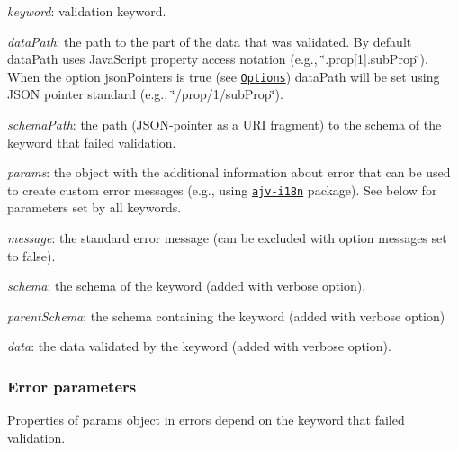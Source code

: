 \begin{DoxyItemize}
\item {\itshape keyword}\+: validation keyword.
\item {\itshape data\+Path}\+: the path to the part of the data that was validated. By default {\ttfamily data\+Path} uses Java\+Script property access notation (e.\+g., {\ttfamily \char`\"{}.\+prop\mbox{[}1\mbox{]}.\+sub\+Prop\char`\"{}}). When the option {\ttfamily json\+Pointers} is true (see \href{#options}{\tt Options}) {\ttfamily data\+Path} will be set using J\+S\+ON pointer standard (e.\+g., {\ttfamily \char`\"{}/prop/1/sub\+Prop\char`\"{}}).
\item {\itshape schema\+Path}\+: the path (J\+S\+O\+N-\/pointer as a U\+RI fragment) to the schema of the keyword that failed validation.
\item {\itshape params}\+: the object with the additional information about error that can be used to create custom error messages (e.\+g., using \href{https://github.com/epoberezkin/ajv-i18n}{\tt ajv-\/i18n} package). See below for parameters set by all keywords.
\item {\itshape message}\+: the standard error message (can be excluded with option {\ttfamily messages} set to false).
\item {\itshape schema}\+: the schema of the keyword (added with {\ttfamily verbose} option).
\item {\itshape parent\+Schema}\+: the schema containing the keyword (added with {\ttfamily verbose} option)
\item {\itshape data}\+: the data validated by the keyword (added with {\ttfamily verbose} option).
\end{DoxyItemize}

\subsubsection*{Error parameters}

Properties of {\ttfamily params} object in errors depend on the keyword that failed validation.


